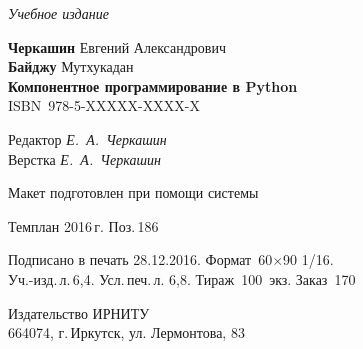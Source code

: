 \documentclass[a4paper,openany,twoside,final]{book}
\providecommand{\DUadmonition}[2][class-arg]{%
  \ifcsname DUadmonition#1\endcsname%
    \csname DUadmonition#1\endcsname{#2}%
  \else
    \begin{center}
      \fbox{\parbox{0.9\textwidth}{#2}}
    \end{center}
  \fi
}
\providecommand*{\DUtitle}[2][class-arg]{%
  \ifcsname DUtitle#1\endcsname%
    \csname DUtitle#1\endcsname{#2}%
  \else
    \smallskip\noindent\textbf{#2}\smallskip%
  \fi
}
\begin{document}






\newpage
\thispagestyle{empty}
\mbox{}

\vfill\vfill\vfill\vfill

\hfill{}{\small\itshape Учебное издание}
\vspace{4ex}
\begin{center}
{\small\textbf{Черкашин} Евгений Александрович\\}
{\small\textbf{Байджу} Мутхукадан\\[1em]}
{\bfseries Компонентное программирование в Python}\\[1em]
ISBN~978-5-XXXXX-XXXX-X
\vfill

\small
Редактор \textit{Е.~А.~Черкашин}\\
Верстка \textit{Е.~А.~Черкашин}

\vfill{}
{\small Макет подготовлен при помощи системы \LaTeXsys\\\mbox{}}
\vfill{}

Темплан 2016\,{}г. Поз.\,{}186

\end{center}
\begin{center}\small
\noindent Подписано в печать 28.12.2016.
Формат~60$\times$90 1/16.\\  %
Уч.-изд.\,{}л.\,{}6,4. Усл.\,{}печ.\,{}л. 6,8. Тираж~100~экз. Заказ~170
\end{center}
\vspace{1           ex}
\begin{center}\small
Издательство ИРНИТУ\\{}
664074, г.\,{}Иркутск, ул. Лермонтова, 83 \label{lastpage}
\end{center}
\end{document}
